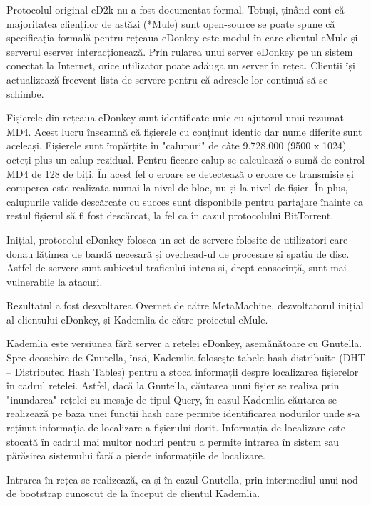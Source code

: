 Protocolul original eD2k nu a fost documentat formal. Totuși, ținând cont că
majoritatea clienților de astăzi (*Mule) sunt open-source se poate spune că
specificația formală pentru rețeaua eDonkey este modul în care clientul eMule
și serverul eserver interacționează. Prin rularea unui server eDonkey pe un
sistem conectat la Internet, orice utilizator poate adăuga un server în rețea.
Clienții își actualizează frecvent lista de servere pentru că adresele lor
continuă să se schimbe.

Fișierele din rețeaua eDonkey sunt identificate unic cu ajutorul unui rezumat
MD4. Acest lucru înseamnă că fișierele cu conținut identic dar nume diferite
sunt aceleași. Fișierele sunt împărțite în "calupuri" de câte 9.728.000 (9500
x 1024) octeți plus un calup rezidual. Pentru fiecare calup se calculează o
sumă de control MD4 de 128 de biți. În acest fel o eroare se detectează o
eroare de transmisie și coruperea este realizată numai la nivel de bloc, nu și
la nivel de fișier. În plus, calupurile valide descărcate cu succes sunt
disponibile pentru partajare înainte ca restul fișierul să fi fost descărcat,
la fel ca în cazul protocolului BitTorrent.

Inițial, protocolul eDonkey folosea un set de servere folosite de utilizatori
care donau lățimea de bandă necesară și overhead-ul de procesare și spațiu de
disc. Astfel de servere sunt subiectul traficului intens și, drept consecință,
sunt mai vulnerabile la atacuri.

Rezultatul a fost dezvoltarea Overnet de către MetaMachine, dezvoltatorul
inițial al clientului eDonkey, și Kademlia de către proiectul eMule.

Kademlia este versiunea fără server a rețelei eDonkey, asemănătoare cu
Gnutella. Spre deosebire de Gnutella, însă, Kademlia folosește tabele hash
distribuite (DHT – Distributed Hash Tables) pentru a stoca informații despre
localizarea fișierelor în cadrul rețelei. Astfel, dacă la Gnutella, căutarea
unui fișier se realiza prin "inundarea" rețelei cu mesaje de tipul Query, în
cazul Kademlia căutarea se realizează pe baza unei funcții hash care permite
identificarea nodurilor unde s-a reținut informația de localizare a fișierului
dorit. Informația de localizare este stocată în cadrul mai multor noduri
pentru a permite intrarea în sistem sau părăsirea sistemului fără a pierde
informațiile de localizare.

Intrarea în rețea se realizează, ca și în cazul Gnutella, prin intermediul
unui nod de bootstrap cunoscut de la început de clientul Kademlia.

